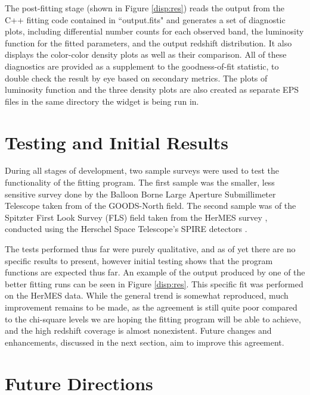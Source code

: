 \documentclass[twocolumn,letterpaper,10pt]{article}
\begin{document}
The post-fitting stage (shown in Figure \ref{disp:res}) reads the output from the C++ fitting code contained in ``output.fits" and generates a set of diagnostic plots, including differential number counts for each observed band, the luminosity function for the fitted parameters, and the output redshift distribution. It also displays the color-color density plots as well as their comparison. All of these diagnostics are provided as a supplement to the goodness-of-fit statistic, to double check the result by eye based on secondary metrics. The plots of luminosity function and the three density plots are also created as separate EPS files in the same directory the widget is being run in.

\section{Testing and Initial Results}\label{example}
During all stages of development, two sample surveys were used to test the functionality of the fitting program. The first sample was the smaller, less sensitive survey done by the Balloon Borne Large Aperture Submillimeter Telescope taken from \citet{Devlin09} of the GOODS-North field. The second sample was of the Spitzter First Look Survey (FLS) field taken from the HerMES survey \citep{HerMES}, conducted using the Herschel Space Telescope's SPIRE detectors \citep{Herschel,SPIRE}.

 The tests performed thus far were purely qualitative, and as of yet there are no specific results to present, however initial testing shows that the program functions are expected thus far. An example of the output produced by one of the better fitting runs can be seen in Figure \ref{disp:res}. This specific fit was performed on the HerMES data. While the general trend is somewhat reproduced, much improvement remains to be made, as the agreement is still quite poor compared to the chi-square levels we are hoping the fitting program will be able to achieve, and the high redshift coverage is almost nonexistent. Future changes and enhancements, discussed in the next section, aim to improve this agreement.

\section{Future Directions}\label{fdirs}
\end{document}
